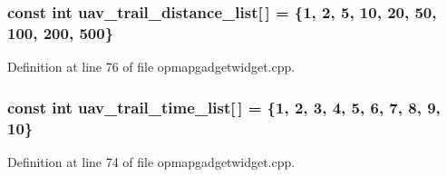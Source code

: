 \hypertarget{group___o_p_map_plugin_ga8974b27951316cb97856a384f680d85e}{
\subsubsection[{uav\-\_\-trail\-\_\-distance\-\_\-list}]{\setlength{\rightskip}{0pt plus 5cm}const {\bf int} uav\-\_\-trail\-\_\-distance\-\_\-list\mbox{[}$\,$\mbox{]} = \{1, 2, 5, 10, 20, 50, 100, 200, 500\}}}\label{group___o_p_map_plugin_ga8974b27951316cb97856a384f680d85e}


Definition at line 76 of file opmapgadgetwidget.\-cpp.

\hypertarget{group___o_p_map_plugin_ga42a1c15ba77f6bec7efc5e15cc2d7a6b}{
\subsubsection[{uav\-\_\-trail\-\_\-time\-\_\-list}]{\setlength{\rightskip}{0pt plus 5cm}const {\bf int} uav\-\_\-trail\-\_\-time\-\_\-list\mbox{[}$\,$\mbox{]} = \{1, 2, 3, 4, 5, 6, 7, 8, 9, 10\}}}\label{group___o_p_map_plugin_ga42a1c15ba77f6bec7efc5e15cc2d7a6b}


Definition at line 74 of file opmapgadgetwidget.\-cpp.



